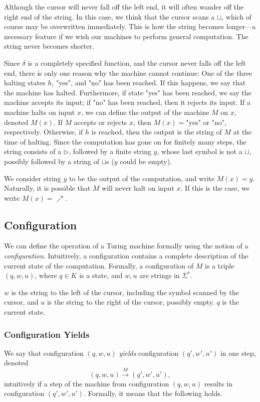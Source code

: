 \documentclass[12pt]{article}
\newcommand{\tr}{\triangleright}
\newcommand{\blank}{\sqcup}
\begin{document}
Although the cursor will never fall off the left end, it will often wander off the right end of the string. In this case, we think that the cursor scans a $\blank$, which of course may be overwritten immediately. This is how the string becomes longer—a necessary feature if we wish our machines to perform general computation. The string never becomes shorter.

Since $\delta$ is a completely specified function, and the cursor never falls off the left end, there is only one reason why the machine cannot continue: One of the three halting states $h$, "yes", and "no" has been reached. If this happens, we say that the machine has halted. Furthermore, if state "yes" has been reached, we say the machine accepts its input; if "no" has been reached, then it rejects its input. If a machine halts on input $x$, we can define the output of the machine $M$ on $x$, denoted $M(x)$. If $M$ accepts or rejects $x$, then $M(x) = \text{"yes"}$ or $\text{"no"}$, respectively. Otherwise, if $h$ is reached, then the output is the string of $M$ at the time of halting. Since the computation has gone on for finitely many steps, the string consists of a $\tr$, followed by a finite string $y$, whose last symbol is not a $\blank$, possibly followed by a string of $\blank$s ($y$ could be empty). 

We consider string $y$ to be the output of the computation, and write $M(x) = y$. Naturally, it is possible that $M$ will never halt on input $x$. If this is the case, we write $M(x) = \nearrow$.

\subsection{Configuration}
We can define the operation of a Turing machine formally using the notion of a \textit{configuration}. Intuitively, a configuration contains a complete description of the current state of the computation. Formally, a configuration of $M$ is a triple $(q, w, u)$, where $q \in K$ is a state, and $w, u$ are strings in $\Sigma^*$. 

$w$ is the string to the left of the cursor, including the symbol scanned by the cursor, and $u$ is the string to the right of the cursor, possibly empty. $q$ is the current state.
\subsubsection{Configuration Yields}
We say that configuration $(q, w, u)$ \textit{yields} configuration $(q', w', u')$ in one step, denoted 
$$(q, w, u) \xrightarrow{M} (q', w', u'),$$ 
intuitively if a step of the machine from configuration $(q, w, u)$ results in configuration $(q', w', u')$. Formally, it means that the following holds. 
\end{document}
